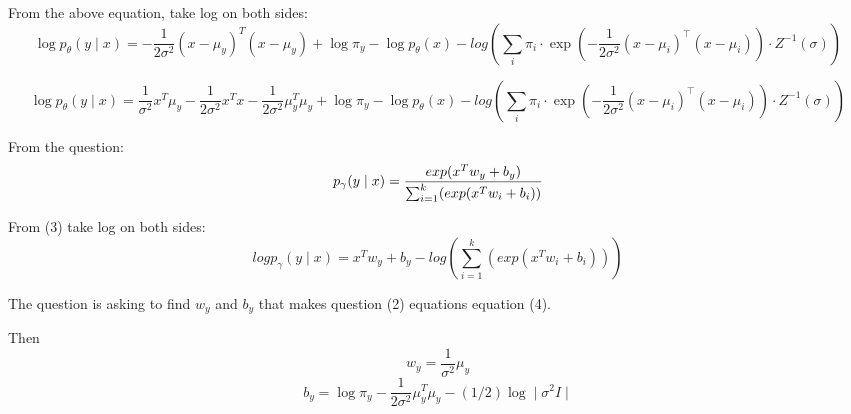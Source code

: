 \begin{answer}




    From the above equation, take log on both sides:
    \begin{equation}
         \log p_{\theta}(y \mid x) = - \frac{1}{2\sigma^2}(x - \mu_y)^T(x - \mu_y) + \log \pi_y - \log p_{\theta}(x) - log(\sum_{i} \pi_i \cdot \exp\left(- \frac{1}{2\sigma^2}\left(x-\mu_{i}\right)^{\top}\left(x-\mu_{i}\right)\right) \cdot Z^{-1}(\sigma))
    \end{equation}

    
    \begin{equation}
         \log p_{\theta}(y \mid x) = \frac{1}{\sigma^2}x^T\mu_y - \frac{1}{2\sigma^2}x^Tx - \frac{1}{2\sigma^2}\mu_y^T\mu_y + \log \pi_y - \log p_{\theta}(x) - log(\sum_{i} \pi_i \cdot \exp\left(- \frac{1}{2\sigma^2}\left(x-\mu_{i}\right)^{\top}\left(x-\mu_{i}\right)\right) \cdot Z^{-1}(\sigma))
    \end{equation}

    From the question:
    \begin{equation}
        p_\gamma(y \mid x) = \frac{exp(x^T w_y + b_y)}{\sum_{i=1}^{k}(exp(x^T w_i + b_i))} \\
    \end{equation}

    From (3) take log on both sides:
    \begin{equation}
        log p_\gamma(y \mid x) = x^T w_y + b_y - log(\sum_{i=1}^{k}(exp(x^T w_i + b_i)))
    \end{equation}

    The question is asking to find \(w_y\) and \(b_y\) that makes question (2) equations equation (4).

    Then
    \begin{equation}
        w_y = \frac{1}{\sigma^2}\mu_y
    \end{equation}
    \begin{equation}
        b_y = \log \pi_y - \frac{1}{2\sigma^2} \mu_y^T \mu_y - (1/2) \log \mid \sigma^2I \mid
    \end{equation}

\end{answer}


